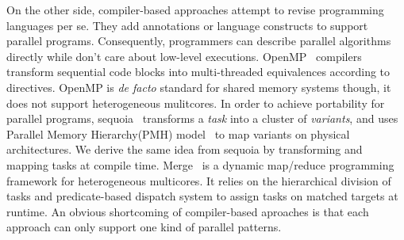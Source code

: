 



On the other side, compiler-based approaches attempt to revise
programming languages per se. They add annotations or language constructs to
support parallel programs. Consequently, programmers
can describe parallel algorithms directly while don't care about low-level executions.
OpenMP~\cite{openmp} compilers transform sequential code blocks into
multi-threaded equivalences according to directives. OpenMP
is \textit{de facto} standard for shared memory systems though, it does not
support heterogeneous mulitcores. In order to achieve portability for
parallel programs, sequoia~\cite{sequoia, sequoia-compiler} transforms a \textit{task} into a cluster of
\emph{variants}, and uses Parallel Memory Hierarchy(PMH)
model~\cite{pmh} to map variants on physical architectures.
We derive the same idea from sequoia by transforming and mapping tasks
at compile time. Merge~\cite{merge} is a dynamic map/reduce programming
framework for heterogeneous multicores. It relies on the hierarchical division of tasks and predicate-based
dispatch system to assign tasks on matched targets at runtime. An obvious shortcoming of compiler-based aproaches is that each
approach can only support one kind of parallel patterns. 

